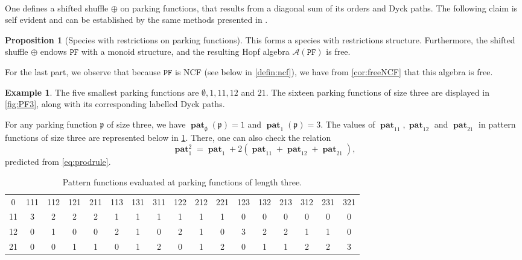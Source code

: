 \documentclass[12pt, reqno]{amsart}
\theoremstyle{definition}
\newtheorem{prop}[thm]{Proposition}
\newtheorem{smpl}[thm]{Example}
\DeclareMathOperator{\pat}{\mathbf{pat}}
\begin{document}
\

One defines a shifted shuffle $\oplus$ on parking functions, that results from a diagonal sum of its orders and Dyck paths.
The following claim is self evident and can be established by the same methods presented in \cite{Penaguiao2020}.

\begin{prop}[Species with restrictions on parking functions]
This forms a species with restrictions structure.
Furthermore, the shifted shuffle $\oplus $ endows $\mathtt{PF}$ with a monoid structure, and the resulting Hopf algebra $\mathcal A(\mathtt{PF})$ is free.
\end{prop}

For the last part, we observe that because $\mathtt{PF}$ is NCF (see below in \cref{defin:ncf}), we have from \cref{cor:freeNCF} that this algebra is free.

\begin{smpl}
The five smallest parking functions are $\emptyset, 1, 11, 12$ and $21$.
The sixteen parking functions of size three are displayed in \cref{fig:PF3}, along with its corresponding labelled Dyck paths.

For any parking function $\mathfrak p$ of size three, we have $\pat_{\emptyset}(\mathfrak p) = 1$ and $\pat_1(\mathfrak p) = 3$.
The values of $\pat_{11}, \pat_{12}$ and $\pat_{21}$ in pattern functions of size three are represented below in \cref{tab:PF3}.
There, one can also check the relation 
\[\pat_1^2 = \pat_1 + 2(\pat_{11} + \pat_{12} + \pat_{21}),\] 
predicted from \eqref{eq:prodrule}.
\end{smpl}
\begin{table}
\begin{tabular}{ c |  c c c c c c c c c c c c c c c c}
 0  & \small{111} & \small{112} & \small{121} & \small{211} & \small{113} & \small{131} & \small{311} & \small{122} & \small{212} & \small{221} & \small{123} & \small{132} & \small{213} & \small{312} & \small{231} & \small{321}\\ 
 11 & 3 & 2 & 2 & 2 & 1 & 1 & 1 & 1 & 1 & 1 & 0 & 0 & 0 & 0 & 0 & 0 \\  
 12 & 0 & 1 & 0 & 0 & 2 & 1 & 0 & 2 & 1 & 0 & 3 & 2 & 2 & 1 & 1 & 0 \\  
 21 & 0 & 0 & 1 & 1 & 0 & 1 & 2 & 0 & 1 & 2 & 0 & 1 & 1 & 2 & 2 & 3 \end{tabular}
\caption{\label{tab:PF3}Pattern functions evaluated at parking functions of length three.}
\end{table}
\end{document}
